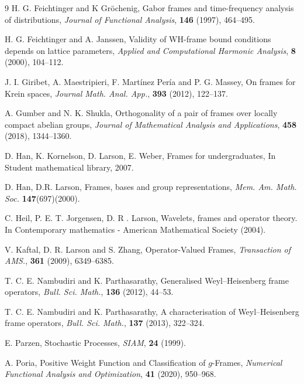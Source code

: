 \documentclass[article,12pt]{amsart}
\begin{document}
\begin{thebibliography}{9}
 H. G. Feichtinger and K Gröchenig, Gabor frames and time-frequency analysis of distributions, \emph{Journal of Functional Analysis},  \textbf{146} (1997),  464--495.


 H. G. Feichtinger and A.  Janssen, Validity of WH-frame bound conditions depends on lattice parameters, \emph{Applied and Computational Harmonic Analysis},  \textbf{8} (2000),  104--112.

 J. I. Giribet, A. Maestripieri, F. Martínez Per\'{i}a and P. G. Massey, On frames for Krein spaces, \emph{Journal Math. Anal. App.}, \textbf{393} (2012), 122--137.

A. Gumber and N. K. Shukla, Orthogonality of a pair of frames over locally compact abelian groups,
\emph{Journal of Mathematical Analysis and Applications}, \textbf{458} (2018), 1344--1360.

 D. Han, K. Kornelson, D. Larson, E. Weber, Frames for undergraduates, In Student mathematical library, 2007. %

 D. Han, D.R. Larson, Frames, bases and group representations, \emph{Mem. Am. Math. Soc.} \textbf{147}(697)(2000). %

  C. Heil, P. E. T. Jorgensen, D. R . Larson,  Wavelets, frames and operator theory. In Contemporary mathematics - American Mathematical Society (2004). %

V. Kaftal, D. R. Larson and S. Zhang, Operator-Valued Frames,  \emph{Transaction of AMS.}, \textbf{361} (2009), 6349--6385.



 
 
  T. C. E. Nambudiri and K. Parthasarathy, Generalised Weyl–Heisenberg frame operators, \emph{Bull. Sci. Math.}, \textbf{136} (2012), 44--53.
 
  T. C. E. Nambudiri and K. Parthasarathy, A characterisation of Weyl–Heisenberg frame operators, \emph{Bull. Sci. Math.}, \textbf{137} (2013), 322--324.
 
  E. Parzen, Stochastic Processes, \emph{SIAM}, \textbf{24} (1999).

 A. Poria, Positive Weight Function and Classification of $g$-Frames, \emph{Numerical Functional Analysis and Optimization},  \textbf{41} (2020), 950--968.














\end{thebibliography}
\end{document}
